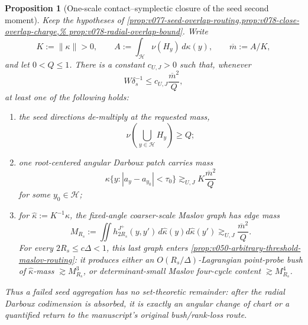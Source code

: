 \documentclass[10pt]{article}
\newtheorem{proposition}[theorem]{Proposition}
\begin{document}
\begin{proposition}[One-scale contact--symplectic closure of the seed second moment]
\label{prop:v078-one-scale-seed-closure}
Keep the hypotheses of
\cref{prop:v077-seed-overlap-routing,prop:v078-close-overlap-charge,%
prop:v078-radial-overlap-bound}.  Write
\[
K:=\|\kappa\|>0,
\qquad
A:=\int_{\mathcal H}\nu(H_y)\,d\kappa(y),
\qquad
\overline m:=A/K,
\]
and let \(0<Q\le1\).  There is a constant \(c_{U,J}>0\) such that, whenever
\begin{equation}
\label{eq:v078-radial-absorption-condition}
W\delta_s^{-1}
\le
c_{U,J}\frac{\overline m^2}{Q},
\end{equation}
at least one of the following holds:
\begin{enumerate}[label=\textnormal{(\roman*)}]
\item the seed directions de-multiply at the requested mass,
\begin{equation}
\label{eq:v078-seed-union-output}
\boxed{
\nu\!\left(\bigcup_{y\in\mathcal H}H_y\right)\ge Q;
}
\end{equation}
\item one root-centered angular Darboux patch carries mass
\begin{equation}
\label{eq:v078-angular-root-output}
\boxed{
\kappa\{y:|a_y-a_{y_0}|<\tau_0\}
\gtrsim_{U,J}
K\frac{\overline m^2}{Q}
}
\end{equation}
for some \(y_0\in\mathcal H\);
\item for \(\widehat\kappa:=K^{-1}\kappa\), the fixed-angle coarser-scale Maslov graph has edge
mass
\begin{equation}
\label{eq:v078-coarse-maslov-edge-output}
\boxed{
M_{R_s}
:=
\iint h_{2R_s}^{J^+}(y,y')\,d\widehat\kappa(y)d\widehat\kappa(y')
\gtrsim_{U,J}
\frac{\overline m^2}{Q}.
}
\end{equation}
For every \(2R_s\le c\Delta<1\), this last graph enters
\cref{prop:v050-arbitrary-threshold-maslov-routing}: it produces either an
\(O(R_s/\Delta)\)-Lagrangian point-probe bush of \(\widehat\kappa\)-mass
\(\gtrsim M_{R_s}^3\), or determinant-small Maslov four-cycle content
\(\gtrsim M_{R_s}^4\).
\end{enumerate}
Thus a failed seed aggregation has no set-theoretic remainder: after the radial Darboux
codimension is absorbed, it is exactly an angular change of chart or a quantified return to the
manuscript's original bush/rank-loss route.
\end{proposition}
\end{document}
